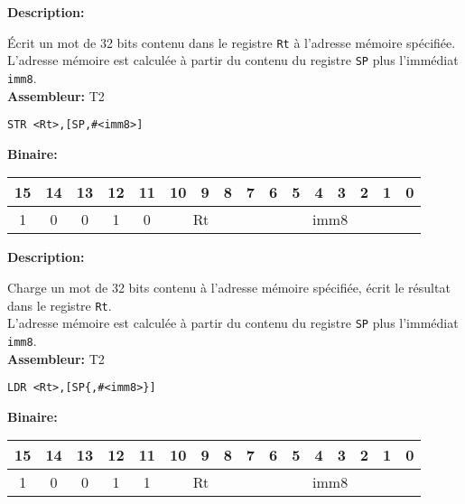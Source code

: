 \documentclass{article}
\begin{document}

    \textbf{Description: }

    Écrit un mot de 32 bits contenu dans le registre \texttt{Rt} à l'adresse mémoire spécifiée.\\
    L'adresse mémoire est calculée à partir du contenu du registre \texttt{SP} plus l'immédiat \texttt{imm8}.\\

    \textbf{Assembleur:} T2

    \begin{lstlisting}
STR <Rt>,[SP,#<imm8>]
    \end{lstlisting}

    \textbf{Binaire:}

    \begin{tabular}{| c c c c c c c c c c c c c c c c |}
        \hline
        15 & 14 & 13 & 12 & \multicolumn{1}{|c}{11} & \multicolumn{1}{|c}{10} & 9 & 8 & \multicolumn{1}{|c}{7} & 6 & 5 & 4 & 3 & 2 & 1 & 0 \\
        \hline
        1 & 0 & 0 & 1 & \multicolumn{1}{|c}{0} & \multicolumn{3}{|c}{Rt} & \multicolumn{8}{|c|}{imm8} \\
        \hline
    \end{tabular}



    \textbf{Description: }

    Charge un mot de 32 bits contenu à l'adresse mémoire spécifiée, écrit le résultat dans le registre \texttt{Rt}.\\
    L'adresse mémoire est calculée à partir du contenu du registre \texttt{SP} plus l'immédiat \texttt{imm8}.\\

    \textbf{Assembleur:} T2

    \begin{lstlisting}
LDR <Rt>,[SP{,#<imm8>}]
    \end{lstlisting}

    \textbf{Binaire:}

    \begin{tabular}{| c c c c c c c c c c c c c c c c |}
        \hline
        15 & 14 & 13 & 12 & \multicolumn{1}{|c}{11} & \multicolumn{1}{|c}{10} & 9 & 8 & \multicolumn{1}{|c}{7} & 6 & 5 & 4 & 3 & 2 & 1 & 0 \\
        \hline
        1 & 0 & 0 & 1 & \multicolumn{1}{|c}{1} & \multicolumn{3}{|c}{Rt} & \multicolumn{8}{|c|}{imm8} \\
        \hline
    \end{tabular}
\end{document}
